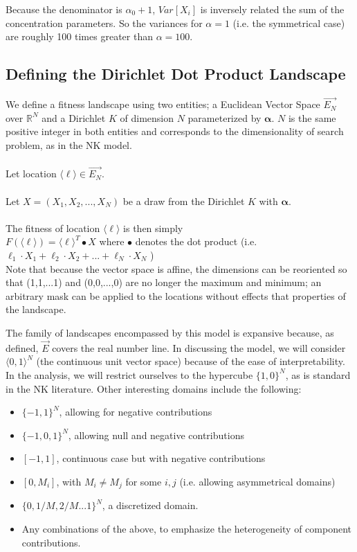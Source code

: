 \documentclass[12pt]{article}
\begin{document}
Because the denominator is $\alpha_0 + 1$, $Var[X_i]$ is inversely related the sum of the concentration parameters. So the variances for $\alpha = 1$ (i.e. the symmetrical case) are roughly 100 times greater than $\alpha = 100$.

\subsection*{Defining the Dirichlet Dot Product Landscape}

We define a fitness landscape using two entities; a Euclidean Vector Space $\vec{E_N}$ over $\mathbb{R}^{N}$ and a Dirichlet $K$ of dimension $N$ parameterized by $\boldsymbol\alpha$. $N$ is the same positive integer in both entities and corresponds to the dimensionality of search problem, as in the NK model.\\~\\

Let location $\langle \ell\rangle \in \vec{E_N}$.\\~\\

Let $X  = (X_1, X_2,..., X_N)$ be a draw from the Dirichlet $K$ with $\boldsymbol\alpha$.\\~\\

The fitness of location $\langle \ell \rangle$ is then simply \\
 $F(\langle \ell \rangle) ={\langle \ell \rangle}^T \bullet X$ where $\bullet$ denotes the dot product (i.e. $ \ell_1 \cdot X_1 + \ell_2 \cdot X_2 +...+\ell_N \cdot X_N$ )\\

Note that because the vector space is affine, the dimensions can be reoriented so that (1,1,...1) and (0,0,...,0) are no longer the maximum and minimum; an arbitrary mask can be applied to the locations without effects that properties of the landscape.

The family of landscapes encompassed by this model is expansive because, as defined, $\vec{E}$ covers the real number line. In discussing the model, we will consider $\langle 0,1 \rangle ^N$ (the continuous unit vector space) because of the ease of interpretability. In the analysis, we will restrict ourselves to the hypercube $\{ 1,0 \} ^N$, as is standard in the NK literature. Other interesting domains include the following:
\begin{itemize}
  \item $\{-1,1 \} ^N$, allowing for negative contributions
  \item $\{-1,0,1 \} ^N$, allowing null and negative contributions
  \item $[-1,1]$, continuous case but with negative contributions
  \item $[0, M_i]$, with $M_i \neq M_j$ for some $i, j$ (i.e. allowing asymmetrical domains)
  \item $\{ 0, 1/M, 2/M...1 \} ^N$, a discretized domain.
  \item Any combinations of the above, to emphasize the heterogeneity of component contributions.
\end{itemize}
\end{document}
